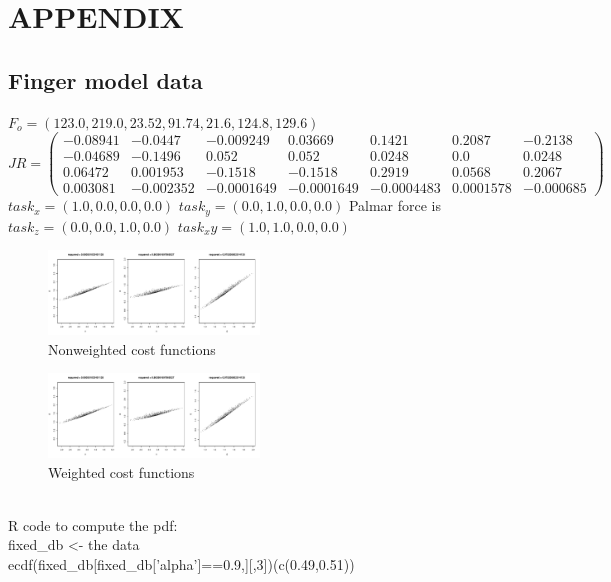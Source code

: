\section{APPENDIX}

\subsection{Finger model data}
$F_o = (123.0, 219.0, 23.52, 91.74,	21.6, 124.8, 129.6)$\\
$
JR = 
\begin{pmatrix}
-0.08941 & -0.0447 & -0.009249 & 0.03669 & 0.1421 & 0.2087 & -0.2138 \\
-0.04689 & -0.1496 & 0.052 &0.052 & 0.0248 & 0.0 & 0.0248 \\ 
0.06472 & 0.001953 & -0.1518 &-0.1518 & 0.2919 & 0.0568 & 0.2067 \\
0.003081 & -0.002352 & -0.0001649 & -0.0001649 & -0.0004483 & 0.0001578 & -0.000685
\end{pmatrix}
$
$task_x = (1.0,0.0,0.0,0.0)$
$task_y = (0.0,1.0,0.0,0.0)$
Palmar force is $task_z = (0.0,0.0,1.0,0.0)$
$task_xy = (1.0,1.0,0.0,0.0)$

\begin{figure}[h]
\centering
\includegraphics[width=0.5\textwidth,page=1]{figs/cost_function_scatterplots.pdf}
\caption{Nonweighted cost functions}
\label{fig:unweighted_cost_functions}
\end{figure}

\begin{figure}[h]
\centering
\includegraphics[width=0.5\textwidth,page=2]{figs/cost_function_scatterplots.pdf}
\caption{Weighted cost functions}
\label{fig:weighted_cost_functions}
\end{figure}

\\
R code to compute the pdf: \\
fixed_db <- the data\\
ecdf(fixed_db[fixed_db['alpha']==0.9,][,3])(c(0.49,0.51))\\